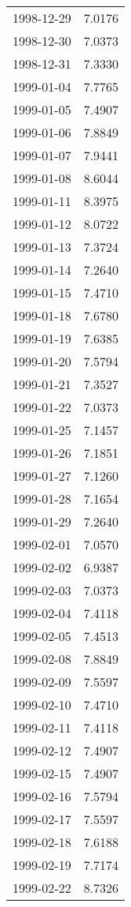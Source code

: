 \begin{tabular}{lr}
1998-12-29 &      7.0176 \\
1998-12-30 &      7.0373 \\
1998-12-31 &      7.3330 \\
1999-01-04 &      7.7765 \\
1999-01-05 &      7.4907 \\
1999-01-06 &      7.8849 \\
1999-01-07 &      7.9441 \\
1999-01-08 &      8.6044 \\
1999-01-11 &      8.3975 \\
1999-01-12 &      8.0722 \\
1999-01-13 &      7.3724 \\
1999-01-14 &      7.2640 \\
1999-01-15 &      7.4710 \\
1999-01-18 &      7.6780 \\
1999-01-19 &      7.6385 \\
1999-01-20 &      7.5794 \\
1999-01-21 &      7.3527 \\
1999-01-22 &      7.0373 \\
1999-01-25 &      7.1457 \\
1999-01-26 &      7.1851 \\
1999-01-27 &      7.1260 \\
1999-01-28 &      7.1654 \\
1999-01-29 &      7.2640 \\
1999-02-01 &      7.0570 \\
1999-02-02 &      6.9387 \\
1999-02-03 &      7.0373 \\
1999-02-04 &      7.4118 \\
1999-02-05 &      7.4513 \\
1999-02-08 &      7.8849 \\
1999-02-09 &      7.5597 \\
1999-02-10 &      7.4710 \\
1999-02-11 &      7.4118 \\
1999-02-12 &      7.4907 \\
1999-02-15 &      7.4907 \\
1999-02-16 &      7.5794 \\
1999-02-17 &      7.5597 \\
1999-02-18 &      7.6188 \\
1999-02-19 &      7.7174 \\
1999-02-22 &      8.7326 \\

\end{tabular}

